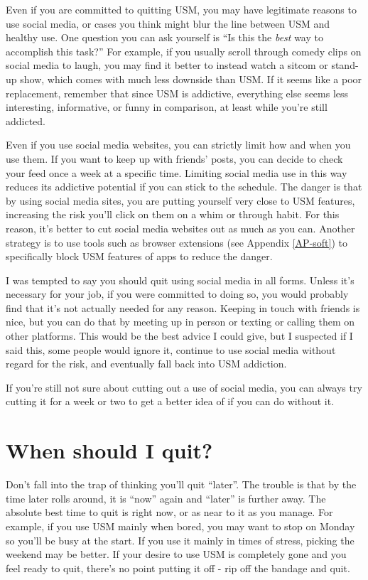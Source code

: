 \documentclass[
  openany]{book}
\begin{document}
Even if you are committed to quitting USM, you may have legitimate reasons to use social media, or cases you think might blur the line between USM and healthy use. One question you can ask yourself is ``Is this the \emph{best} way to accomplish this task?'' For example, if you usually scroll through comedy clips on social media to laugh, you may find it better to instead watch a sitcom or stand-up show, which comes with much less downside than USM. If it seems like a poor replacement, remember that since USM is addictive, everything else seems less interesting, informative, or funny in comparison, at least while you're still addicted.

Even if you use social media websites, you can strictly limit how and when you use them. If you want to keep up with friends' posts, you can decide to check your feed once a week at a specific time. Limiting social media use in this way reduces its addictive potential if you can stick to the schedule. The danger is that by using social media sites, you are putting yourself very close to USM features, increasing the risk you'll click on them on a whim or through habit. For this reason, it's better to cut social media websites out as much as you can. Another strategy is to use tools such as browser extensions (see Appendix \ref{AP-soft}) to specifically block USM features of apps to reduce the danger.

I was tempted to say you should quit using social media in all forms. Unless it's necessary for your job, if you were committed to doing so, you would probably find that it's not actually needed for any reason. Keeping in touch with friends is nice, but you can do that by meeting up in person or texting or calling them on other platforms. This would be the best advice I could give, but I suspected if I said this, some people would ignore it, continue to use social media without regard for the risk, and eventually fall back into USM addiction.

If you're still not sure about cutting out a use of social media, you can always try cutting it for a week or two to get a better idea of if you can do without it.

\section{When should I quit?}\label{when-should-i-quit}

Don't fall into the trap of thinking you'll quit ``later''. The trouble is that by the time later rolls around, it is ``now'' again and ``later'' is further away. The absolute best time to quit is right now, or as near to it as you manage. For example, if you use USM mainly when bored, you may want to stop on Monday so you'll be busy at the start. If you use it mainly in times of stress, picking the weekend may be better. If your desire to use USM is completely gone and you feel ready to quit, there's no point putting it off - rip off the bandage and quit.
\end{document}
